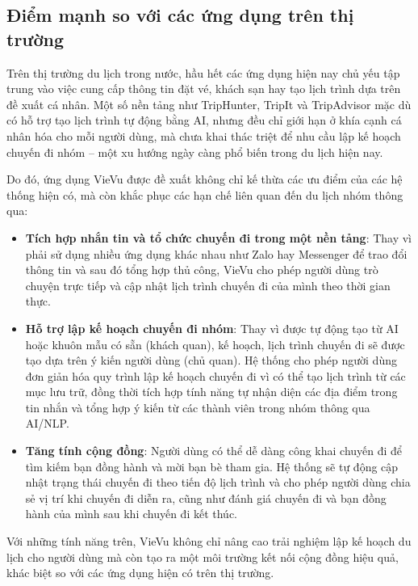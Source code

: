 \subsection{Điểm mạnh so với các ứng dụng trên thị trường}

Trên thị trường du lịch trong nước, hầu hết các ứng dụng hiện nay chủ yếu tập trung vào việc cung cấp thông tin đặt vé, khách sạn hay tạo lịch trình dựa trên đề xuất cá nhân. Một số nền tảng như TripHunter, TripIt và TripAdvisor mặc dù có hỗ trợ tạo lịch trình tự động bằng AI, nhưng đều chỉ giới hạn ở khía cạnh cá nhân hóa cho mỗi người dùng, mà chưa khai thác triệt để nhu cầu lập kế hoạch chuyến đi nhóm – một xu hướng ngày càng phổ biến trong du lịch hiện nay.

Do đó, ứng dụng VieVu được đề xuất không chỉ kế thừa các ưu điểm của các hệ thống hiện có, mà còn khắc phục các hạn chế liên quan đến du lịch nhóm thông qua:
\begin{itemize}
  \item \textbf{Tích hợp nhắn tin và tổ chức chuyến đi trong một nền tảng}: Thay vì phải sử dụng nhiều ứng dụng khác nhau như Zalo hay Messenger để trao đổi thông tin và sau đó tổng hợp thủ công, VieVu cho phép người dùng trò chuyện trực tiếp và cập nhật lịch trình chuyến đi của mình theo thời gian thực.

  \item \textbf{Hỗ trợ lập kế hoạch chuyến đi nhóm}: Thay vì được tự động tạo từ AI hoặc khuôn mẫu có sẵn (khách quan), kế hoạch, lịch trình chuyến đi sẽ được tạo dựa trên ý kiến người dùng (chủ quan). Hệ thống cho phép người dùng đơn giản hóa quy trình lập kế hoạch chuyến đi vì có thể tạo lịch trình từ các mục lưu trữ, đồng thời tích hợp tính năng tự nhận diện các địa điểm trong tin nhắn và tổng hợp ý kiến từ các thành viên trong nhóm thông qua AI/NLP.

  \item \textbf{Tăng tính cộng đồng}: Người dùng có thể dễ dàng công khai chuyến đi để tìm kiếm bạn đồng hành và mời bạn bè tham gia. Hệ thống sẽ tự động cập nhật trạng thái chuyến đi theo tiến độ lịch trình và cho phép người dùng chia sẻ vị trí khi chuyến đi diễn ra, cũng như đánh giá chuyến đi và bạn đồng hành của mình sau khi chuyến đi kết thúc.

\end{itemize}

\indent Với những tính năng trên, VieVu không chỉ nâng cao trải nghiệm lập kế hoạch du lịch cho người dùng mà còn tạo ra một môi trường kết nối cộng đồng hiệu quả, khác biệt so với các ứng dụng hiện có trên thị trường.


